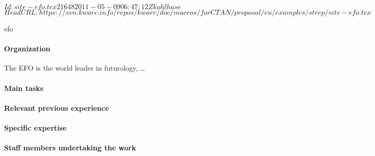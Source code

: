 \svnInfo $Id: site-efo.tex 21648 2011-05-09 06:47:12Z kohlhase $
\svnKeyword $HeadURL: https://svn.kwarc.info/repos/kwarc/doc/macros/forCTAN/proposal/eu/examples/strep/site-efo.tex $
\begin{sitedescription}{efo}
\paragraph{Organization}
 The EFO is the world leader in futurology, \ldots
\paragraph{Main tasks}
\paragraph{Relevant previous experience}
\paragraph{Specific expertise}
\paragraph{Staff members undertaking the work}
\end{sitedescription}

